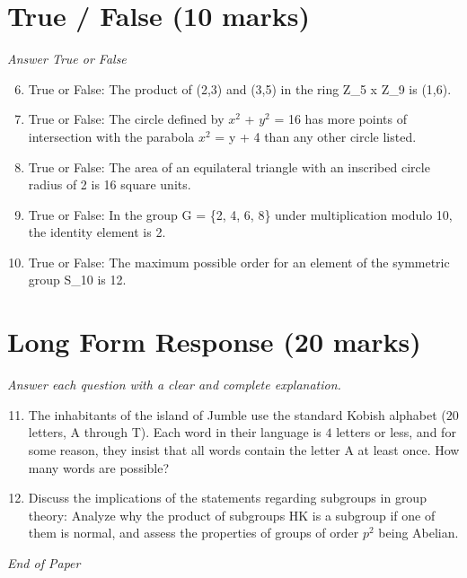 \documentclass[12pt]{article}
\begin{document}
\section*{True / False (10 marks)}
\textit{Answer True or False}
\begin{enumerate}[label=\arabic*.]
\setcounter{enumi}{5}
\item True or False: The product of (2,3) and (3,5) in the ring Z\_5 x Z\_9 is (1,6).
\item True or False: The circle defined by $x^2$ + $y^2$ = 16 has more points of intersection with the parabola $x^2$ = y + 4 than any other circle listed.
\item True or False: The area of an equilateral triangle with an inscribed circle radius of 2 is 16 square units.
\item True or False: In the group G = \{2, 4, 6, 8\} under multiplication modulo 10, the identity element is 2.
\item True or False: The maximum possible order for an element of the symmetric group S\_10 is 12.
\end{enumerate}

\section*{Long Form Response (20 marks)}
\textit{Answer each question with a clear and complete explanation.}
\begin{enumerate}[label=\arabic*.]
\setcounter{enumi}{10}
\item The inhabitants of the island of Jumble use the standard Kobish alphabet ($20$ letters, A through T). Each word in their language is $4$ letters or less, and for some reason, they insist that all words contain the letter A at least once. How many words are possible?
\item Discuss the implications of the statements regarding subgroups in group theory: Analyze why the product of subgroups HK is a subgroup if one of them is normal, and assess the properties of groups of order $p^2$ being Abelian.
\end{enumerate}

\vfill
\noindent\textit{End of Paper}
\end{document}
